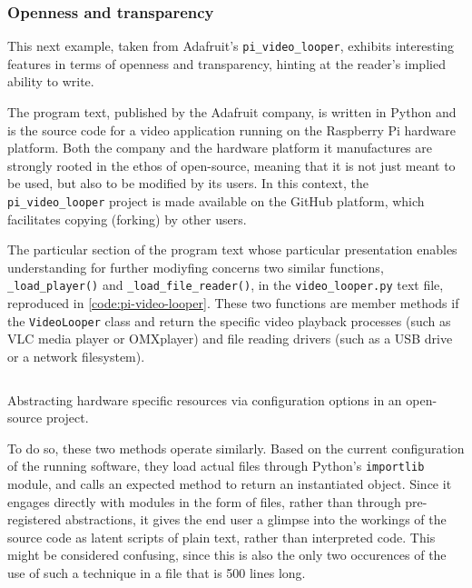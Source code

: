 \subsubsection{Openness and transparency}
\label{subsubsec:openness-transparency}

This next example, taken from Adafruit's \lstinline{pi_video_looper}, exhibits interesting features in terms of openness and transparency, hinting at the reader's implied ability to write.

The program text, published by the Adafruit company, is written in Python and is the source code for a video application running on the Raspberry Pi hardware platform. Both the company and the hardware platform it manufactures are strongly rooted in the ethos of open-source, meaning that it is not just meant to be used, but also to be modified by its users. In this context, the \lstinline{pi_video_looper} project is made available on the GitHub platform, which facilitates copying (forking) by other users.

The particular section of the program text whose particular presentation enables understanding for further modiyfing concerns two similar functions, \lstinline{_load_player()} and \lstinline{_load_file_reader()}, in the \lstinline{video_looper.py} text file, reproduced in \ref{code:pi-video-looper}. These two functions are member methods if the \lstinline{VideoLooper} class and return the specific video playback processes (such as VLC media player or OMXplayer) and file reading drivers (such as a USB drive or a network filesystem).

\begin{listing}
  \inputminted{python}{./corpus/pi_video_looper.py}
  \caption{Abstracting hardware specific resources via configuration options in an open-source project. \citep{dicola_pi_2015}}
  \label{code:pi-video-looper}
\end{listing}

To do so, these two methods operate similarly. Based on the current configuration of the running software, they load actual files through Python's \lstinline{importlib} module, and calls an expected method to return an instantiated object. Since it engages directly with modules in the form of files, rather than through pre-registered abstractions, it gives the end user a glimpse into the workings of the source code as latent scripts of plain text, rather than interpreted code. This might be considered confusing, since this is also the only two occurences of the use of such a technique in a file that is 500 lines long.

